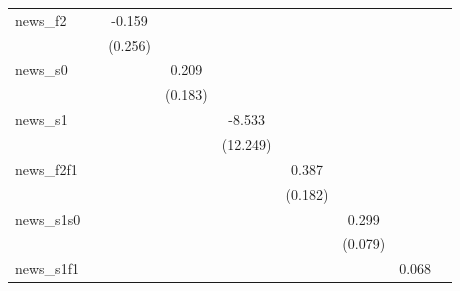 {\begin{tabular}{l*{8}{c}}
\addlinespace
news\_f2     &                     &      -0.159         &                     &                     &                     &                     &                     &                     \\
            &                     &     (0.256)         &                     &                     &                     &                     &                     &                     \\
\addlinespace
news\_s0     &                     &                     &       0.209         &                     &                     &                     &                     &                     \\
            &                     &                     &     (0.183)         &                     &                     &                     &                     &                     \\
\addlinespace
news\_s1     &                     &                     &                     &      -8.533         &                     &                     &                     &                     \\
            &                     &                     &                     &    (12.249)         &                     &                     &                     &                     \\
\addlinespace
news\_f2f1   &                     &                     &                     &                     &       0.387\sym{**} &                     &                     &                     \\
            &                     &                     &                     &                     &     (0.182)         &                     &                     &                     \\
\addlinespace
news\_s1s0   &                     &                     &                     &                     &                     &       0.299\sym{***}&                     &                     \\
            &                     &                     &                     &                     &                     &     (0.079)         &                     &                     \\
\addlinespace
news\_s1f1   &                     &                     &                     &                     &                     &                     &       0.068         &                     \\

\end{tabular}}
